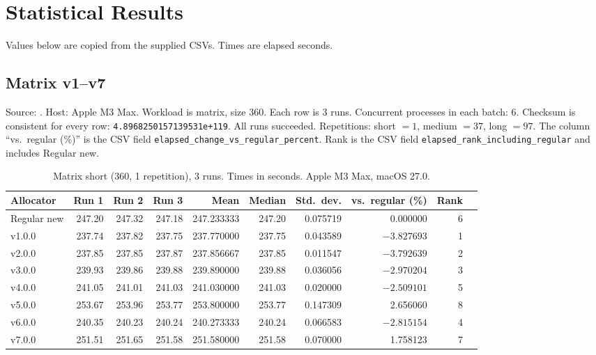 \section{Statistical Results}
\label{sec:statistical-results}

Values below are copied from the supplied CSVs.
Times are elapsed seconds.

\subsection{Matrix v1--v7}

Source: .
Host: Apple M3 Max.
Workload is matrix, size 360.
Each row is 3 runs.
Concurrent processes in each batch: 6.
Checksum is consistent for every row: \texttt{4.8968250157139531e+119}.
All runs succeeded.
Repetitions: short $=1$, medium $=37$, long $=97$.
The column ``vs.\ regular (\%)'' is the CSV field \texttt{elapsed\_change\_vs\_regular\_percent}.
Rank is the CSV field \texttt{elapsed\_rank\_including\_regular} and includes Regular new.

\begin{table}[H]
\centering
\caption{Matrix short (360, 1 repetition), 3 runs. Times in seconds. Apple M3 Max, macOS 27.0.}
\label{tab:matrix-short}
\footnotesize
\setlength{\tabcolsep}{4pt}
\begin{tabular}{@{}l rrr rrr rr r@{}}
\toprule
Allocator & Run 1 & Run 2 & Run 3 & Mean & Median & Std.\ dev. & vs.\ regular (\%) & Rank \\
\midrule
Regular new & 247.20 & 247.32 & 247.18 & 247.233333 & 247.20 & 0.075719 & 0.000000 & 6 \\
v1.0.0 & 237.74 & 237.82 & 237.75 & 237.770000 & 237.75 & 0.043589 & $-3.827693$ & 1 \\
v2.0.0 & 237.85 & 237.85 & 237.87 & 237.856667 & 237.85 & 0.011547 & $-3.792639$ & 2 \\
v3.0.0 & 239.93 & 239.86 & 239.88 & 239.890000 & 239.88 & 0.036056 & $-2.970204$ & 3 \\
v4.0.0 & 241.05 & 241.01 & 241.03 & 241.030000 & 241.03 & 0.020000 & $-2.509101$ & 5 \\
v5.0.0 & 253.67 & 253.96 & 253.77 & 253.800000 & 253.77 & 0.147309 & 2.656060 & 8 \\
v6.0.0 & 240.35 & 240.23 & 240.24 & 240.273333 & 240.24 & 0.066583 & $-2.815154$ & 4 \\
v7.0.0 & 251.51 & 251.65 & 251.58 & 251.580000 & 251.58 & 0.070000 & 1.758123 & 7 \\
\bottomrule
\end{tabular}
\end{table}

